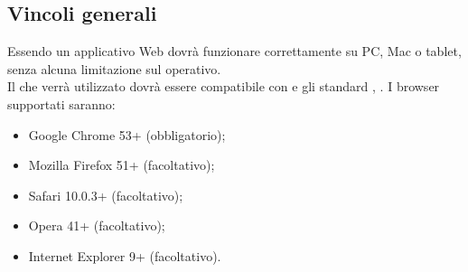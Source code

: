 \subsection{Vincoli generali}
Essendo un applicativo Web dovrà funzionare correttamente su PC, Mac o tablet, senza alcuna limitazione sul  operativo.\\
Il  che verrà utilizzato dovrà essere compatibile con  e gli standard , .
I browser supportati saranno: 
\begin{itemize}
	\item Google Chrome 53+ (obbligatorio);
	\item Mozilla Firefox 51+ (facoltativo);
	\item Safari 10.0.3+ (facoltativo);
	\item Opera 41+ (facoltativo);
	\item Internet Explorer 9+ (facoltativo).
\end{itemize}